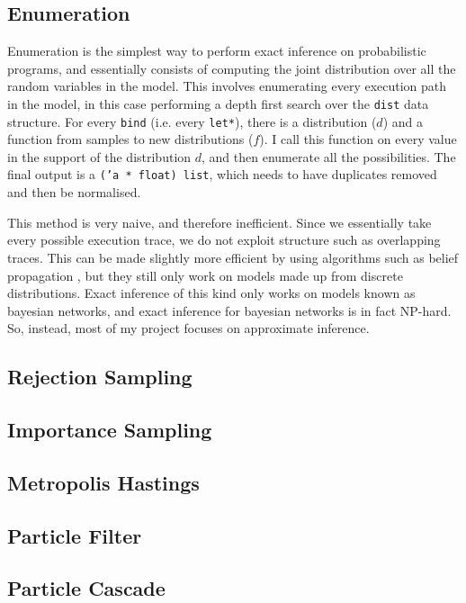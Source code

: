 \subsection{Enumeration} \label{sec:enum}
Enumeration is the simplest way to perform exact inference on probabilistic programs, and essentially consists of computing the joint distribution over all the random variables in the model. This involves enumerating every execution path in the model, in this case performing a depth first search over the \texttt{dist} data structure. For every \texttt{bind} (i.e. every \texttt{let*}), there is a distribution ($d$) and a function from samples to new distributions ($f$). I call this function on every value in the support of the distribution $d$, and then enumerate all the possibilities. The final output is a \texttt{('a * float) list}, which needs to have duplicates removed and then be normalised.



This method is very naive, and therefore inefficient. Since we essentially take every possible execution trace, we do not exploit structure such as overlapping traces. This can be made slightly more efficient by using algorithms such as belief propagation \cite{belief-prop}, but they still only work on models made up from discrete distributions. Exact inference of this kind only works on models known as bayesian networks, and exact inference for bayesian networks is in fact NP-hard\cite{cooper1990computational}. So, instead, most of my project focuses on approximate inference.

\subsection{Rejection Sampling} \label{sec:rej}
\subsection{Importance Sampling} \label{sec:imp}
\subsection{Metropolis Hastings} \label{sec:mh}
\subsection{Particle Filter} \label{sec:pf}
\subsection{Particle Cascade} \label{sec:pc}
